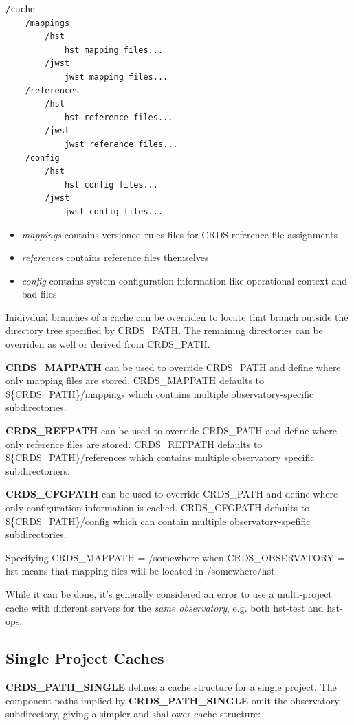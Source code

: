 \documentclass[letterpaper,10pt,english]{sphinxmanual}
\begin{document}
\begin{Verbatim}[commandchars=\\\{\}]
/cache
    /mappings
        /hst
            hst mapping files...
        /jwst
            jwst mapping files...
    /references
        /hst
            hst reference files...
        /jwst
            jwst reference files...
    /config
        /hst
            hst config files...
        /jwst
            jwst config files...
\end{Verbatim}
\begin{itemize}
\item {} 
\emph{mappings} contains versioned rules files for CRDS reference file assignments

\item {} 
\emph{references} contains reference files themselves

\item {} 
\emph{config} contains system configuration information like operational context and bad files

\end{itemize}

Inidivdual branches of a cache can be overriden to locate that branch outside the directory
tree specified by CRDS\_PATH.   The remaining directories can be overriden as well or derived
from CRDS\_PATH.

\textbf{CRDS\_MAPPATH} can be used to override CRDS\_PATH and define where
only mapping files are stored.  CRDS\_MAPPATH defaults to \$\{CRDS\_PATH\}/mappings
which contains multiple observatory-specific subdirectories.

\textbf{CRDS\_REFPATH} can be used to override CRDS\_PATH and define where
only reference files are stored.  CRDS\_REFPATH defaults to \$\{CRDS\_PATH\}/references
which contains multiple observatory specific subdirectoriers.

\textbf{CRDS\_CFGPATH} can be used to override CRDS\_PATH and define where
only configuration information is cached. CRDS\_CFGPATH defaults to \$\{CRDS\_PATH\}/config
which can contain multiple observatory-spefific subdirectories.

Specifying CRDS\_MAPPATH = /somewhere when CRDS\_OBSERVATORY = hst means that
mapping files will be located in /somewhere/hst.

While it can be done,  it's generally considered an error to use a multi-project cache
with different servers for the \emph{same observatory}, e.g. both hst-test and hst-ops.


\subsection{Single Project Caches}
\label{installation:single-project-caches}
\textbf{CRDS\_PATH\_SINGLE} defines a cache structure for a single project.  The component paths
implied by \textbf{CRDS\_PATH\_SINGLE}  omit the observatory subdirectory,  giving a simpler and
shallower cache structure:
\end{document}

